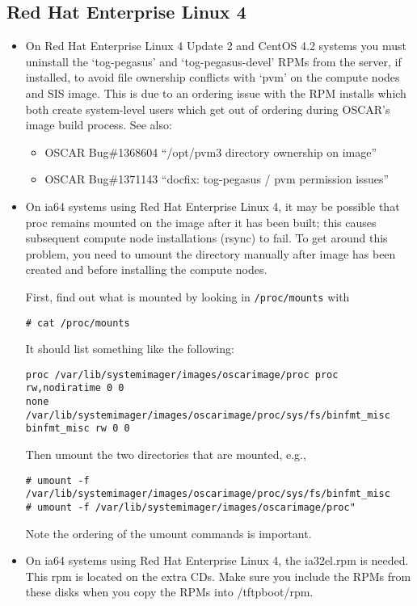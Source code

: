 
\subsection{Red Hat Enterprise Linux 4}
\label{subsec:rhel4notes}

\begin{itemize}

\item On Red Hat Enterprise Linux 4 Update 2 and CentOS 4.2 systems you 
      must uninstall the `tog-pegasus' and `tog-pegasus-devel' RPMs from the 
      server, if installed, to 
      avoid file ownership conflicts with `pvm' on the compute nodes and SIS 
      image.  This is due to an ordering issue with the RPM installs which 
      both create system-level users which get out of ordering during OSCAR's 
      image build process.  See also:
      \begin{itemize}
		\item OSCAR Bug\#1368604 ``/opt/pvm3 directory ownership on image''
		\item OSCAR Bug\#1371143 ``docfix: tog-pegasus / pvm permission issues''
      \end{itemize}

\item On ia64 systems using Red Hat Enterprise Linux 4, it may be possible
  that proc remains mounted
  on the image after it has been built; this causes subsequent compute node
  installations (rsync) to fail.  To get around this problem, you need to
  umount the directory manually after image has been created and before
  installing the compute nodes.
 
  First, find out what is mounted by looking in {\tt /proc/mounts} with
  \begin{verbatim}
# cat /proc/mounts
  \end{verbatim}
  It should list something like the following:
  \begin{verbatim}
proc /var/lib/systemimager/images/oscarimage/proc proc rw,nodiratime 0 0
none /var/lib/systemimager/images/oscarimage/proc/sys/fs/binfmt_misc
binfmt_misc rw 0 0
  \end{verbatim}
  Then umount the two directories that are mounted, e.g.,
  \begin{verbatim}
# umount -f /var/lib/systemimager/images/oscarimage/proc/sys/fs/binfmt_misc
# umount -f /var/lib/systemimager/images/oscarimage/proc"
  \end{verbatim}
  Note the ordering of the umount commands is important.

\item On ia64 systems using Red Hat Enterprise Linux 4, the ia32el.rpm is
  needed.  This rpm is located on the extra CDs.  Make sure you include
  the RPMs from these disks when you copy the RPMs into /tftpboot/rpm.

\end{itemize}

